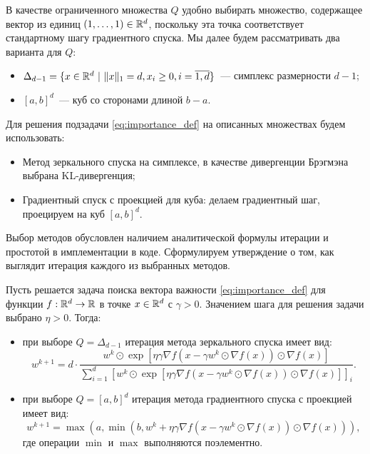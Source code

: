     В качестве ограниченного множества $Q$ удобно выбирать множество, содержащее вектор из единиц $(1, \dots, 1) \in \mathbb{R}^d$, поскольку эта точка соответствует стандартному шагу градиентного спуска. Мы далее будем рассматривать два варианта для $Q$:
    \begin{itemize}
        \item $\Delta_{d - 1} = \{x \in \mathbb{R}^d ~|~ \|x\|_1 = d, x_i \geq 0, i = \overline{1, d}\}$~--- симплекс размерности $d - 1$;
        \item $[a, b]^d$~--- куб со сторонами длиной $b - a$.
    \end{itemize}
    Для решения подзадачи \eqref{eq:importance_def} на описанных множествах будем использовать:
    \begin{itemize}
        \item Метод зеркального спуска на симплексе, в качестве дивергенции Брэгмэна выбрана KL-дивергенция;
        \item Градиентный спуск с проекцией для куба: делаем градиентный шаг, проецируем на куб $[a, b]^d$.
    \end{itemize}
    Выбор методов обусловлен наличием аналитической формулы итерации и простотой в имплементации в коде. Сформулируем утверждение о том, как выглядит итерация каждого из выбранных методов.
    \begin{proposition}
        Пусть решается задача поиска вектора важности \eqref{eq:importance_def} для функции $f: \mathbb{R}^d \to \mathbb{R}$ в точке $x \in \mathbb{R}^d$ с $\gamma > 0$. Значением шага для решения задачи выбрано $\eta > 0$. Тогда:
        \begin{itemize}
            \item при выборе $Q = \Delta_{d - 1}$ итерация метода зеркального спуска имеет вид:
            \begin{equation}\label{eq:mirror_descent_step}
                w^{k + 1} = d \cdot \frac{w^k \odot \exp[\eta \gamma \nabla f(x - \gamma w^k \odot \nabla f(x)) \odot \nabla f(x)]}{\sum_{i = 1}^d \left[w^k \odot \exp[\eta \gamma \nabla f(x - \gamma w^k \odot \nabla f(x)) \odot \nabla f(x)]\right]_i}.
            \end{equation}
            \item при выборе $Q = [a, b]^d$ итерация метода градиентного спуска с проекцией имеет вид:
            \begin{equation}\label{eq:proj_gradient_descent_step}
                w^{k + 1} = \max\left(a, \min\left(b, w^k + \eta \gamma \nabla f(x - \gamma w^k \odot \nabla f(x)) \odot \nabla f(x)\right)\right),
            \end{equation}
            где операции $\min$ и $\max$ выполняются поэлементно.
        \end{itemize}
    \end{proposition}
